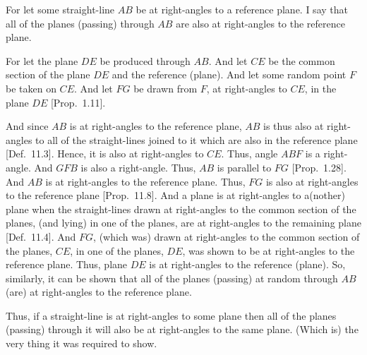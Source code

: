 \begin{Parallel}{}{}
{For let some straight-line $AB$ be at right-angles to a reference plane.
I say that all of the planes (passing) through $AB$ are also at right-angles to 
the reference plane.

For let the plane $DE$ be produced through $AB$. And let $CE$
be the common section of the plane $DE$ and the reference (plane).
And let some random point $F$ be taken on $CE$. And let
$FG$ be drawn from $F$, at right-angles to $CE$, in the plane $DE$
[Prop.~1.11].

And since $AB$ is at right-angles to the reference plane, $AB$ is thus also
at right-angles to all of the straight-lines joined to it which are also in the reference
plane [Def.~11.3]. Hence, it is also at right-angles to
$CE$. Thus, angle $ABF$ is a right-angle. And $GFB$ is also a right-angle.
Thus, $AB$ is parallel to $FG$ [Prop.~1.28].
And $AB$ is at right-angles to the reference plane. Thus, $FG$ is also
at right-angles to the reference plane [Prop.~11.8].
And a plane is at right-angles to a(nother) plane when the straight-lines drawn at
right-angles to the common section
of the planes,  (and lying) in one of the planes,
are at right-angles to the remaining plane [Def.~11.4].
And $FG$, (which was) drawn  at right-angles to the common
section of the planes, $CE$, in one of the planes, $DE$,  was shown  to be at right-angles to the reference plane. Thus, plane $DE$ is at right-angles
to the reference (plane). So, similarly, it can be shown that   all of the planes
(passing) at random through $AB$ (are) at right-angles to the
reference plane.

\centerline{}

Thus, if  a straight-line is at right-angles to some plane then all of the planes (passing) through it will also be at right-angles to the same
plane. (Which is) the very thing it was required to show.}
\end{Parallel}

